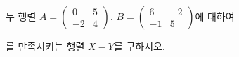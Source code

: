 두 행렬 $A=\begin{pmatrix} 0 & 5 \\ -2 & 4 \end{pmatrix}$, $B=\begin{pmatrix} 6 & -2 \\ -1 & 5 \end{pmatrix}$에 대하여 \par\smallskip{}\par\smallskip\noindent 를 만족시키는 행렬 $X-Y$를 구하시오.
